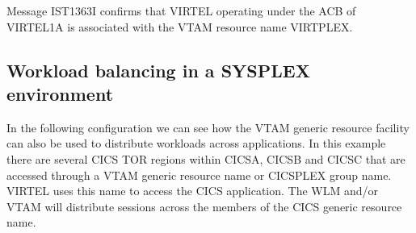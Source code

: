 \documentclass[letterpaper,10pt,english]{sphinxmanual}
\begin{document}
\begin{sphinxVerbatim}[commandchars=\\\{\}]
         
      
          
   
         
        
 
        
      
 
\end{sphinxVerbatim}

\sphinxAtStartPar
Message IST1363I confirms that VIRTEL operating under the ACB of VIRTEL1A is associated with the VTAM resource name VIRTPLEX.

\newpage

\ignorespaces 

\subsection{Workload balancing in a SYSPLEX environment}
\label{\detokenize{connectivity_guide:workload-balancing-in-a-sysplex-environment}}\label{\detokenize{connectivity_guide:index-178}}
\sphinxAtStartPar
In the following configuration we can see how the VTAM generic resource facility can also be used to distribute workloads across applications. In this example there are several CICS TOR regions within CICSA, CICSB and CICSC that are accessed through a VTAM generic resource name or CICSPLEX group name. VIRTEL uses this name to access the CICS application. The WLM and/or VTAM will distribute sessions across the members of the CICS generic resource name.
\end{document}
